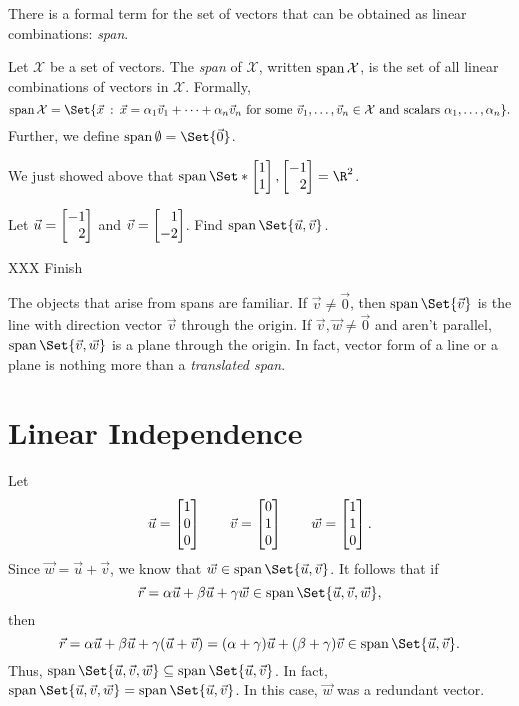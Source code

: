 There is a formal term for the set of vectors that can be obtained as linear combinations: \emph{span}.

\begin{definition}[Span]
	Let $\mathcal X$ be a set of vectors. The \emph{span} of $\mathcal X$, written $\operatorname{span} \mathcal X$,
	is the set of all linear combinations of vectors in $\mathcal X$. Formally,
	\[
	\Span \mathcal X = \Set{\vec x\given \vec x = \alpha_1\vec v_1+
	\cdots+\alpha_n\vec v_n\text{ for some }\vec v_1,\ldots,\vec v_n\in\mathcal X
	\text{ and scalars }\alpha_1,\ldots,\alpha_n}.
	\]
	Further, we define $\Span\emptyset =\Set{\vec 0}$.
\end{definition}

We just showed above that $\Span\Set*{\mat{1\\1},\mat{-1\\2}}=\R^2$.

\begin{example}
	Let $\vec u=\mat{-1\\2}$ and $\vec v=\mat{1\\-2}$. Find $\Span\Set{\vec u,\vec v}$.

	XXX Finish
\end{example}

The objects that arise from spans are familiar. If $\vec v\neq\vec 0$, then $\Span\Set{\vec v}$
is the line with direction vector $\vec v$ through the origin. If $\vec v,\vec w\neq \vec 0$ and
aren't parallel, $\Span\Set{\vec v,\vec w}$ is a plane through the origin. In fact, vector form of
a line or a plane is nothing more than a \emph{translated span}.

\section{Linear Independence}

Let
\[
	\vec u=\mat{1\\0\\0}\qquad\vec v=\mat{0\\1\\0}\qquad \vec w=\mat{1\\1\\0}.
\]
Since $\vec w=\vec u+\vec v$, we know that $\vec w\in\Span\Set{\vec u,\vec v}$. It follows
that if 
\[
	\vec r=\alpha\vec u+\beta\vec u+\gamma\vec w\in\Span\Set{\vec u,\vec v,\vec w},
\] then
\[
	\vec r=\alpha\vec u+\beta\vec u+\gamma(\vec u+\vec v) 
	= (\alpha+\gamma)\vec u+(\beta+\gamma)\vec v\in\Span\Set{\vec u,\vec v}.
\]
Thus, $\Span\Set{\vec u,\vec v,\vec w}\subseteq \Span\Set{\vec u,\vec v}$. In fact, 
$\Span\Set{\vec u,\vec v,\vec w}= \Span\Set{\vec u,\vec v}$. In this case, $\vec w$ was a redundant
vector.

